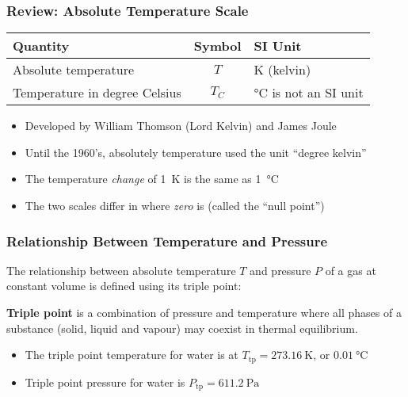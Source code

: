 \documentclass[12pt,aspectratio=169]{beamer}
\newcommand{\eq}[2]{\vspace{#1}{\Large\begin{displaymath}#2\end{displaymath}}}
\begin{document}
\begin{frame}
  \frametitle{Review: Absolute Temperature Scale}
  \eq{.01in}{
    \boxed{T = T_C + 273.15}
  }
  \begin{center}
    \begin{tabular}{l|c|l}
      \rowcolor{pink}
      \textbf{Quantity}     & \textbf{Symbol} & \textbf{SI Unit} \\ \hline
      Absolute temperature  & $T$            & \si{\kelvin} (kelvin) \\
      Temperature in degree Celsius & $T_C$  & \si{\celsius} is not an SI unit
    \end{tabular}
  \end{center}
  \begin{itemize}
  \item Developed by William Thomson (Lord Kelvin) and James Joule
  \item Until the 1960's, absolutely temperature used the unit ``degree kelvin''
  \item The temperature \emph{change} of \SI{1}{\kelvin} is the same as
    \SI{1}{\celsius}
  \item The two scales differ in where \emph{zero} is (called the
    ``null point'')
  \end{itemize}
\end{frame}
  

\begin{frame}
  \frametitle{Relationship Between Temperature and Pressure}
  The relationship between absolute temperature $T$ and pressure $P$
  of a gas at constant volume is defined using its triple point:

  \eq{-.1in}{
    T=\frac{T_\mathrm{tp}}{P_\mathrm{tp}}P
  }

  \textbf{Triple point} is a combination of pressure and temperature where all
  phases of a substance (solid, liquid and vapour) may coexist in thermal
  equilibrium.
  \begin{itemize}
  \item The triple point temperature for water is at
    $T_\mathrm{tp}=\SI{273.16}{\kelvin}$, or $\SI{0.01}{\celsius}$
  \item Triple point pressure for water is $P_\mathrm{tp}=\SI{611.2}{\pascal}$
  \end{itemize}
\end{frame}
\end{document}
